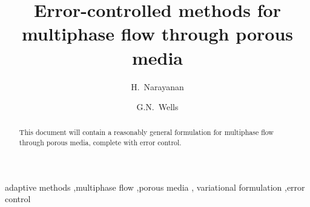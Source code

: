\begin{frontmatter}

\title{Error-controlled methods for multiphase flow through porous media}

\author[srl]{H.~Narayanan}
\author[cam]{G.N.~Wells}

\address[srl]{Center for Biomedical Computing, Simula Research
  Laboratory, P.O.~Box~134, 1325~Lysaker, Norway}
\address[cam]{Department of Engineering, University of Cambridge,
  Trumpington Street, Cambridge CB2 1PZ, U.K.}

\begin{abstract}
This document will contain a reasonably general formulation for
multiphase flow through porous media, complete with error control.
\end{abstract}

\begin{keyword}
adaptive methods \sep multiphase flow \sep porous media \sep
variational formulation \sep error control
\end{keyword}

\end{frontmatter}

